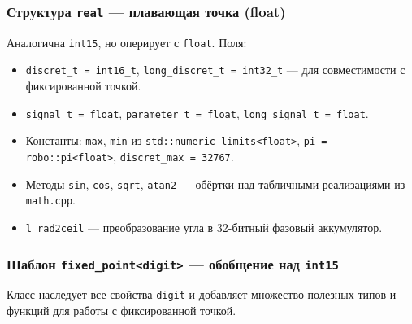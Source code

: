 \documentclass[a4paper,12pt]{article}
\begin{document}
\subsubsection{Структура \texttt{real} — плавающая точка (float)}

Аналогична \texttt{int15}, но оперирует с \texttt{float}. Поля:
\begin{itemize}
    \item \texttt{discret\_t = int16\_t}, \texttt{long\_discret\_t = int32\_t} — для совместимости с фиксированной точкой.
    \item \texttt{signal\_t = float}, \texttt{parameter\_t = float}, \texttt{long\_signal\_t = float}.
    \item Константы: \texttt{max}, \texttt{min} из \texttt{std::numeric\_limits<float>}, \texttt{pi = robo::pi<float>}, \texttt{discret\_max = 32767}.
    \item Методы \texttt{sin}, \texttt{cos}, \texttt{sqrt}, \texttt{atan2} — обёртки над табличными реализациями из \texttt{math.cpp}.
    \item \texttt{l\_rad2ceil} — преобразование угла в 32-битный фазовый аккумулятор.
\end{itemize}

\subsubsection{Шаблон \texttt{fixed\_point<digit>} — обобщение над \texttt{int15}}

Класс наследует все свойства \texttt{digit} и добавляет множество полезных типов и функций для работы с фиксированной точкой.
\end{document}
